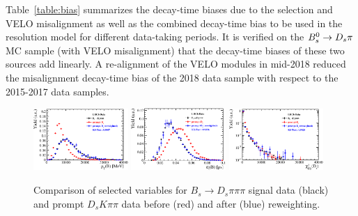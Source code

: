 Table~\ref{table:bias} summarizes the decay-time biases due to the selection and VELO misalignment as well as the combined decay-time bias 
to be used in the resolution model for different data-taking periods.
It is verified on the ${{B}^0_{s}}\rightarrow{\ensuremath{{D}_{s}}}{\ensuremath{\pi}}$ MC sample (with VELO misalignment) that the decay-time biases of these two sources add linearly.
A re-alignment of the VELO modules in mid-2018 reduced the misalignment decay-time bias of the 2018 data sample with respect to the 2015-2017 data samples.

\begin{figure}[h]
\centering
	\includegraphics[width=0.32\textwidth, height = !]{figs/dataVsMC/LTU_noTimeCut/Ds2all_16_Bs_PT.eps} 
	\includegraphics[width=0.32\textwidth, height = !]{figs/dataVsMC/LTU_noTimeCut/Ds2all_16_Bs_DTF_TAUERR.eps} 
	\includegraphics[width=0.32\textwidth, height = !]{figs/dataVsMC/LTU_noTimeCut/Ds2all_16_Ds_FDCHI2_ORIVX.eps} 
\caption{Comparison of selected variables for $B_s \to D_s \pi\pi\pi$ signal data (black) and prompt $D_sK\pi\pi$ data before (red) and after (blue) reweighting.}
\label{fig:rwLTU}
\end{figure}

